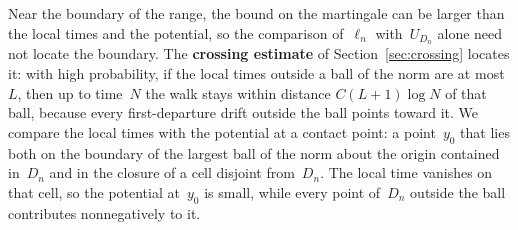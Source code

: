 \documentclass[11pt]{amsart}
\theoremstyle{plain}
\theoremstyle{definition}
\newcommand{\defn}[1]{\textbf{#1}}
\numberwithin{equation}{section}
\begin{document}
Near the boundary of the range, the bound on the martingale can be larger than the local times and the potential, so the comparison of~$\ell_n$ with~$U_{D_n}$ alone need not locate the boundary. The \defn{crossing estimate} of Section~\ref{sec:crossing} locates it: with high probability, if the local times outside a ball of the norm are at most~$L$, then up to time~$N$ the walk stays within distance $C(L+1)\log N$ of that ball, because every first-departure drift outside the ball points toward it. We compare the local times with the potential at a contact point: a point~$y_0$ that lies both on the boundary of the largest ball of the norm about the origin contained in~$D_n$ and in the closure of a cell disjoint from~$D_n$. The local time vanishes on that cell, so the potential at~$y_0$ is small, while every point of~$D_n$ outside the ball contributes nonnegatively to it.
\end{document}
